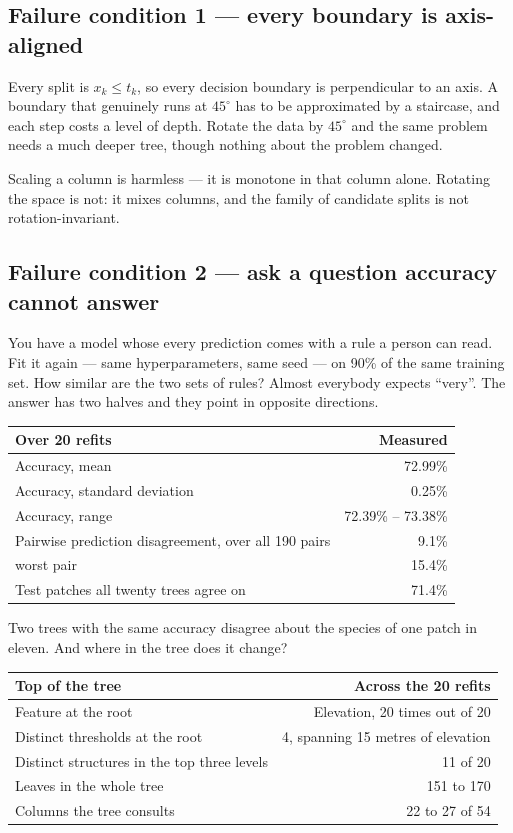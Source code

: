 \documentclass[11pt,a4paper]{article}
\begin{document}
\subsection{Failure condition 1 --- every boundary is axis-aligned}

Every split is $x_k \le t_k$, so every decision boundary is perpendicular to an
axis. A boundary that genuinely runs at $45^\circ$ has to be approximated by a
staircase, and each step costs a level of depth. Rotate the data by
$45^\circ$ and the same problem needs a much deeper tree, though nothing about
the problem changed.

Scaling a column is harmless --- it is monotone in that column alone. Rotating
the space is not: it mixes columns, and the family of candidate splits is not
rotation-invariant.

\subsection{Failure condition 2 --- ask a question accuracy cannot answer}

You have a model whose every prediction comes with a rule a person can read.
Fit it again --- same hyperparameters, same seed --- on 90\% of the same
training set. How similar are the two sets of rules? Almost everybody expects
``very''. The answer has two halves and they point in opposite directions.

\begin{center}
\small
\begin{tabular}{lr}
\toprule
\textbf{Over 20 refits} & \textbf{Measured} \\
\midrule
Accuracy, mean & 72.99\% \\
Accuracy, standard deviation & 0.25\% \\
Accuracy, range & 72.39\% -- 73.38\% \\
Pairwise prediction disagreement, over all 190 pairs & 9.1\% \\
\quad worst pair & 15.4\% \\
Test patches all twenty trees agree on & 71.4\% \\
\bottomrule
\end{tabular}
\end{center}

Two trees with the same accuracy disagree about the species of one patch in
eleven. And where in the tree does it change?

\begin{center}
\small
\begin{tabular}{lr}
\toprule
\textbf{Top of the tree} & \textbf{Across the 20 refits} \\
\midrule
Feature at the root & Elevation, 20 times out of 20 \\
Distinct thresholds at the root & 4, spanning 15 metres of elevation \\
Distinct structures in the top three levels & 11 of 20 \\
Leaves in the whole tree & 151 to 170 \\
Columns the tree consults & 22 to 27 of 54 \\
\bottomrule
\end{tabular}
\end{center}
\end{document}
